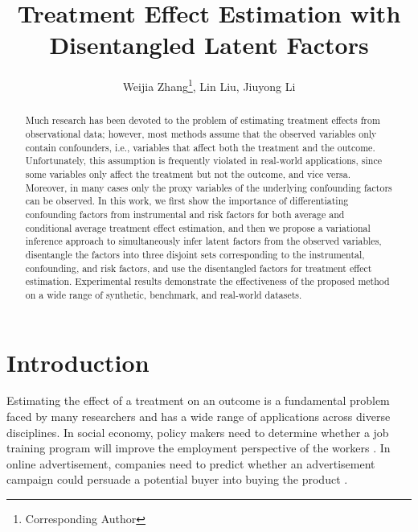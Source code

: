 \documentclass[letterpaper]{article} %
\title{Treatment Effect Estimation with Disentangled Latent Factors}
\author {
        Weijia Zhang\footnote{Corresponding Author},
        Lin Liu,
        Jiuyong Li \\
}
\begin{document}
\maketitle

\begin{abstract}
Much research has been devoted to the problem of estimating treatment effects from observational data; however, most methods assume that the observed variables only contain confounders, i.e., variables that affect both the treatment and the outcome. Unfortunately, this assumption is frequently violated in real-world applications, since some variables only affect the treatment but not the outcome, and vice versa. Moreover, in many cases only the proxy variables of the underlying confounding factors can be observed.
In this work, we first show the importance of differentiating confounding factors from instrumental and risk factors for both average and conditional average treatment effect estimation, and then we propose a variational inference approach to simultaneously infer latent factors from the observed variables, disentangle the factors into three disjoint sets corresponding to the instrumental, confounding, and risk factors, and use the disentangled factors for treatment effect estimation.
Experimental results demonstrate the effectiveness of the proposed method on a wide range of synthetic, benchmark, and real-world datasets.
\end{abstract}

\section*{Introduction}
Estimating the effect of a treatment on an outcome is a fundamental problem faced by many researchers and has a wide range of applications across diverse disciplines.
In social economy, policy makers need to determine whether a job training program will improve the employment perspective of the workers \cite{Athey2015}.
In online advertisement, companies need to predict whether an advertisement campaign could persuade a potential buyer into buying the product \cite{Rzepakowski2011}.
\end{document}
